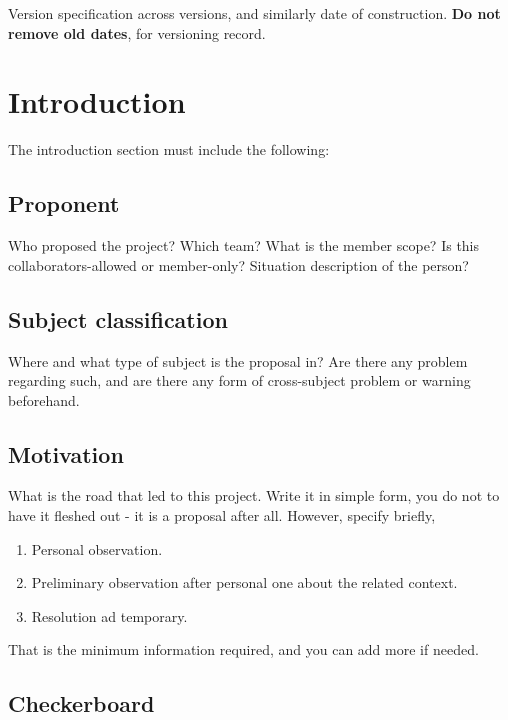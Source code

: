 \documentclass[10pt,a4paper]{article}
\begin{document}
Version specification across versions, and similarly date of construction. \textbf{Do not remove old dates}, for versioning record. 

\section{Introduction}
\label{sec:intro}

The introduction section must include the following:

\subsection{Proponent}

Who proposed the project? Which team? What is the member scope? Is this collaborators-allowed or member-only? Situation description of the person?

\subsection{Subject classification}

Where and what type of subject is the proposal in? Are there any problem regarding such, and are there any form of cross-subject problem or warning beforehand. 

\subsection{Motivation}

What is the road that led to this project. Write it in simple form, you do not to have it fleshed out - it is a proposal after all. However, specify briefly,

\begin{enumerate}
    \item Personal observation. 
    \item Preliminary observation after personal one about the related context. 
    \item Resolution ad temporary. 
\end{enumerate}

That is the minimum information required, and you can add more if needed. 

\subsection{Checkerboard}
\end{document}
